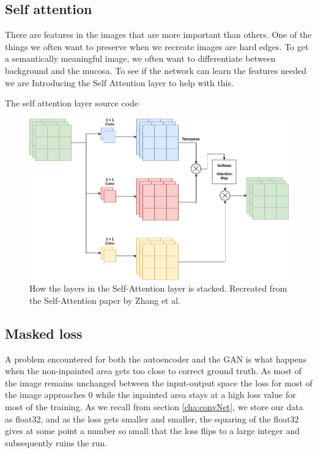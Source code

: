 \subsection{Self attention}
There are features in the images that are more important than others. One of the things we often want to preserve when we recreate images are hard edges. To get a semantically meaningful image,  we often want to differentiate between background and the mucosa. 
To see if the network can learn the features needed we are Introducing the Self Attention layer to help with this. 

\begin{minipage}{\linewidth}
\begin{listing}

\caption{The self attention layer source code}
\label{listing:Attention}
\end{listing}
\end{minipage}

\begin{figure}[h]
\centering
\includegraphics[scale=0.4]{methodology/figures/attention.png}
\caption{How the layers in the Self-Attention layer is stacked. Recreated from the Self-Attention  paper by Zhang et al.~\cite{DBLP:journals/corr/selfattention}}
\label{fig:Attention}
\end{figure}



\subsection{Masked loss}
A problem encountered for both the autoencoder and the GAN is what happens when the non-inpainted area gets too close to correct ground truth. 
As most of the image remains unchanged between the input-output space the loss for most of the image approaches 0 while the inpainted area stays at a high loss value for most of the training. 
As we recall from section \ref{cha:convNet}, we store our data as float32, and as the loss gets smaller and smaller, the squaring of the float32 gives at some point a number so small that the loss flips to a large integer and subsequently ruins the run. 

